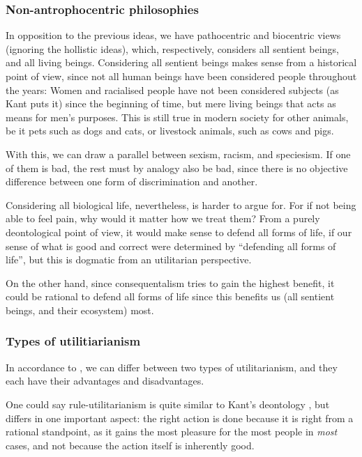 \documentclass{article}
\newcommand{\q}[1]{``#1''}
\begin{document}
		\subsubsection*{Non-antrophocentric philosophies}
		
		In opposition to the previous ideas, we have pathocentric and biocentric views (ignoring the hollistic ideas), which, respectively, considers all sentient beings, and all living beings. Considering all sentient beings makes sense from a historical point of view, since not all human beings have been considered people throughout the years: Women and racialised people have not been considered subjects (as Kant puts it) since the beginning of time, but mere living beings that acts as means for men's purposes. This is still true in modern society for other animals, be it pets such as dogs and cats, or livestock animals, such as cows and pigs. 

		With this, we can draw a parallel between sexism, racism, and speciesism. If one of them is bad, the rest must by analogy also be bad, since there is no objective difference between one form of discrimination and another. \autocite{singerequal}

		Considering all biological life, nevertheless, is harder to argue for. For if not being able to feel pain, why would it matter how we treat them? From a purely deontological point of view, it would make sense to defend all forms of life, if our sense of what is good and correct were determined by \q{defending all forms of life}, but this is dogmatic from an utilitarian perspective. 

		On the other hand, since consequentalism tries to gain the highest benefit, it could be rational to defend all forms of life since this benefits us (all sentient beings, and their ecosystem) most.

		\subsubsection*{Types of utilitiarianism} 

		In accordance to \citet{smarttypes}, we can differ between two types of utilitarianism, and they each have their advantages and disadvantages. 

		One could say rule-utilitarianism is quite similar to Kant's deontology \autocite{kant}, but differs in one important aspect: the right action is done because it is right from a rational standpoint, as it gains the most pleasure for the most people in \emph{most} cases, and not because the action itself is inherently good.
\end{document}

